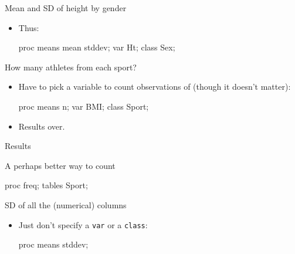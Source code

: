 \documentclass[unknownkeysallowed]{beamer}\usepackage[]{graphicx}\usepackage[]{color}
\begin{document}
\begin{frame}[fragile]{Mean and SD of height by gender}
  
  \begin{itemize}
  \item Thus:
    
    \begin{Sascode}[store=sb]
proc means mean stddev;
  var Ht;
  class Sex;
    \end{Sascode}
    
  \end{itemize}
  
\end{frame}

\begin{frame}[fragile]{How many athletes from each sport?}
  
  \begin{itemize}
  \item Have to pick a variable to count observations of (though it
    doesn't matter):
    
    \begin{Sascode}[store=sc]
proc means n;
  var BMI;
  class Sport;
    \end{Sascode}
  \item Results over.
    
  \end{itemize}
  
\end{frame}

\begin{frame}[fragile]{Results}
  
  
  
\end{frame}

\begin{frame}[fragile]{A perhaps better way to count}
  
  \begin{Sascode}[store=sd]
proc freq;
  tables Sport;
  \end{Sascode}
  
  
\end{frame}


\begin{frame}[fragile]{SD of all the (numerical) columns}
  
  \begin{itemize}
  \item Just don't specify a \texttt{var} or a \texttt{class}:
    
    \begin{Sascode}[store=se]
proc means stddev;
    \end{Sascode}
    
  \end{itemize}
  
\end{frame}
\end{document}
